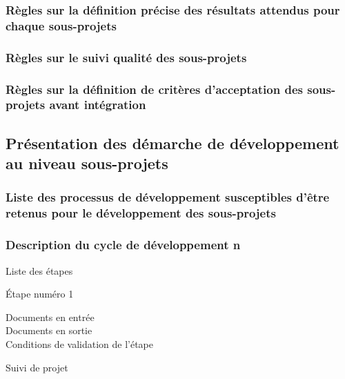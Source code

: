         \subsubsection{Règles sur la définition précise des résultats attendus pour chaque sous-projets}

        \subsubsection{Règles sur le suivi qualité des sous-projets}

        \subsubsection{Règles sur la définition de critères d’acceptation des sous-projets avant intégration}

    \subsection{Présentation des démarche de développement au niveau sous-projets}

        \subsubsection{Liste des processus de développement susceptibles d’être retenus pour le
            développement des sous-projets}

        \subsubsection{Description du cycle de développement n}

            \par{Liste des étapes}

            \par{Étape numéro 1}

            \begin{description}
                \item[Documents en entrée]
                \item[Documents en sortie]
                \item[Conditions de validation de l'étape]
            \end{description}

            \par{Suivi de projet}
